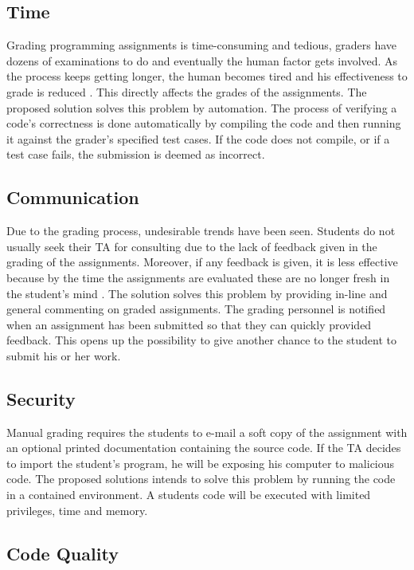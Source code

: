 \subsection{Time}

Grading programming assignments is time-consuming and tedious, graders have
dozens of examinations to do and eventually the human factor gets involved. As
the process keeps getting longer, the human becomes tired and his effectiveness
to grade is reduced \cite{Cheang2003}. This directly affects the grades of the
assignments. The proposed solution solves this problem by automation. The
process of verifying a code's correctness is done automatically by compiling the
code and then running it against the grader's specified test cases. If the code
does not compile, or if a test case fails, the submission is deemed as
incorrect.

\subsection{Communication}

Due to the grading process, undesirable trends have been seen. Students do not
usually seek their TA for consulting due to the lack of feedback given in the
grading of the assignments. Moreover, if any feedback is given, it is less
effective because by the time the assignments are evaluated these are no longer
fresh in the student's mind \cite{Cheang2003}. The solution solves this problem
by providing in-line and general commenting on graded assignments. The grading
personnel is notified when an assignment has been submitted so that they can
quickly provided feedback. This opens up the possibility to give another chance
to the student to submit his or her work.

\subsection{Security}

Manual grading requires the students to e-mail a soft copy of the assignment
with an optional printed documentation containing the source code. If the TA
decides to import the student's program, he will be exposing his computer to
malicious code. The proposed solutions intends to solve this problem by running
the code in a contained environment. A students code will be executed with
limited privileges, time and memory.

\subsection{Code Quality}

